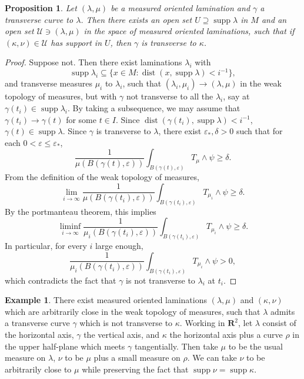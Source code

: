 \documentclass[reqno,11pt]{amsart}
\newcommand{\RR}{\mathbf{R}}
\DeclareMathOperator{\dist}{dist}
\DeclareMathOperator{\supp}{supp}
\newtheorem{proposition}[theorem]{Proposition}
\theoremstyle{definition}
\newtheorem{example}[theorem]{Example}
\numberwithin{equation}{section}
\begin{document}
\begin{proposition}
Let $(\lambda, \mu)$ be a measured oriented lamination and $\gamma$ a transverse curve to $\lambda$.
Then there exists an open set $U \supseteq \supp \lambda$ in $M$ and an open set $\mathcal U \ni (\lambda, \mu)$ in the space of measured oriented laminations, such that if $(\kappa, \nu) \in \mathcal U$ has support in $U$, then $\gamma$ is transverse to $\kappa$.
\end{proposition}
\begin{proof}
Suppose not. Then there exist laminations $\lambda_i$ with
$$\supp \lambda_i \subseteq \{x \in M: \dist(x, \supp \lambda) < i^{-1}\},$$
and transverse measures $\mu_i$ to $\lambda_i$, such that $(\lambda_i, \mu_i) \to (\lambda, \mu)$ in the weak topology of measures, but with $\gamma$ not transverse to all the $\lambda_i$, say at $\gamma(t_i) \in \supp \lambda_i$.
By taking a subsequence, we may assume that $\gamma(t_i) \to \gamma(t)$ for some $t \in I$.
Since $\dist(\gamma(t_i), \supp \lambda) < i^{-1}$, $\gamma(t) \in \supp \lambda$.
Since $\gamma$ is transverse to $\lambda$, there exist $\varepsilon_*, \delta > 0$ such that for each $0 < \varepsilon \leq \varepsilon_*$,
$$\frac{1}{\mu(B(\gamma(t), \varepsilon))} \int_{B(\gamma(t), \varepsilon)} T_\mu \wedge \psi \geq \delta.$$
From the definition of the weak topology of measures,
$$\lim_{i \to \infty} \frac{1}{\mu(B(\gamma(t_i), \varepsilon))} \int_{B(\gamma(t_i), \varepsilon)} T_{\mu_i} \wedge \psi \geq \delta.$$
By the portmanteau theorem, this implies
$$\liminf_{i \to \infty} \frac{1}{\mu_i(B(\gamma(t_i), \varepsilon))} \int_{B(\gamma(t_i), \varepsilon)} T_{\mu_i} \wedge \psi \geq \delta.$$
In particular, for every $i$ large enough,
$$\frac{1}{\mu_i(B(\gamma(t_i), \varepsilon))} \int_{B(\gamma(t_i), \varepsilon)} T_{\mu_i} \wedge \psi > 0,$$
which contradicts the fact that $\gamma$ is not transverse to $\lambda_i$ at $t_i$.
\end{proof}

\begin{example}
There exist measured oriented laminations $(\lambda, \mu)$ and $(\kappa, \nu)$ which are arbitrarily close in the weak topology of measures, such that $\lambda$ admits a transverse curve $\gamma$ which is not transverse to $\kappa$.
Working in $\RR^2$, let $\lambda$ consist of the horizontal axis, $\gamma$ the vertical axis, and $\kappa$ the horizontal axis plus a curve $\rho$ in the upper half-plane which meets $\gamma$ tangentially.
Then take $\mu$ to be the usual measure on $\lambda$, $\nu$ to be $\mu$ plus a small measure on $\rho$.
We can take $\nu$ to be arbitrarily close to $\mu$ while preserving the fact that $\supp \nu = \supp \kappa$.
\end{example}
\end{document}
